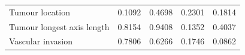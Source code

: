 \documentclass[dissertation.tex]{subfiles}
\begin{document}
\begin{table}[h]
\begin{tabular}{@{}l@{\qquad}ll@{\qquad\quad}ll@{}}
Tumour location            & 0.1092                          & 0.4698 & 0.2301                          & 0.1814                          \\
Tumour longest axis length & 0.8154                          & 0.9408 & 0.1352                          & 0.4037                          \\
Vascular invasion          & 0.7806                          & 0.6266 & 0.1746                          & 0.0862                          \\ \bottomrule
\end{tabular}

\end{table}
\end{document}
